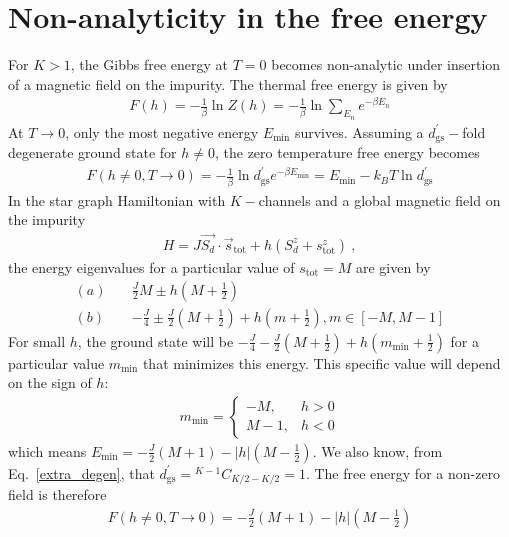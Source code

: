 \documentclass{revtex4-2}
\begin{document}
\section{Non-analyticity in the free energy}
For \(K>1\), the Gibbs free energy at \(T=0\) becomes non-analytic under insertion of a magnetic field on the impurity. The thermal free energy is given by
\begin{align}
	F(h) = -\frac{1}{\beta}\ln Z(h) = -\frac{1}{\beta}\ln\sum_{E_n}e^{-\beta E_n}
\end{align}
At \(T \to 0\), only the most negative energy \(E_\text{min}\) survives. Assuming a \(d^\prime_\text{gs}-\)fold degenerate ground state for \(h \neq 0\), the zero temperature free energy becomes
\begin{align}
	F(h\neq 0, T\to 0) = -\frac{1}{\beta}\ln d^\prime_\text{gs}e^{-\beta E_\text{min}} = E_\text{min}- k_B T\ln d^\prime_\text{gs}
\end{align}
In the star graph Hamiltonian with \(K-\)channels and a global magnetic field on the impurity
\begin{align}
	H = J \vec{S_d}\cdot\vec{s}_\text{tot} + h\left(S_d^z + s^z_\text{tot}\right) ~,
\end{align}
the energy eigenvalues for a particular value of \(s_\text{tot}=M\) are given by
\begin{align}
	(a) \quad&\frac{J}{2}M \pm h\left(M + \frac{1}{2}\right)\\
	(b) \quad&-\frac{J}{4}\pm \frac{J}{2}\left(M + \frac{1}{2}\right) + h\left( m + \frac{1}{2} \right), m \in \left[-M, M-1\right] 
\end{align}
For small \(h\), the ground state will be \(-\frac{J}{4}- \frac{J}{2}\left(M + \frac{1}{2}\right) + h\left(m_\text{min} + \frac{1}{2} \right)\) for a particular value \(m_\text{min}\) that minimizes this energy. This specific value will depend on the sign of \(h\):
\begin{align}
	m_\text{min} = \begin{cases}
		-M, & h >0\\
		M-1,& h< 0
	\end{cases}
\end{align}
which means \(E_\text{min} = -\frac{J}{2}\left( M + 1 \right) - |h|\left(M - \frac{1}{2}\right)\). We also know, from Eq.~\ref{extra_degen}, that \(d^\prime_\text{gs} = {}^{K-1}C_{K/2 - K/2} = 1\).
The free energy for a non-zero field is therefore
\begin{align}
	F(h\neq 0, T\to 0) = -\frac{J}{2}\left( M + 1 \right) - |h|\left(M - \frac{1}{2}\right)
\end{align}
\end{document}
